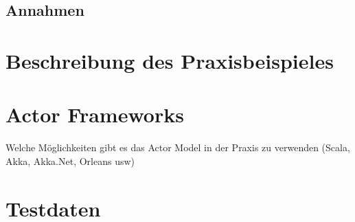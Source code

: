 \subsection{Annahmen}


\section{Beschreibung des Praxisbeispieles}


\section{Actor Frameworks}\label{sec:ActorFrameworks}
Welche Möglichkeiten gibt es das Actor Model in der Praxis zu verwenden (Scala, Akka, Akka.Net, Orleans usw)

\section{Testdaten}
